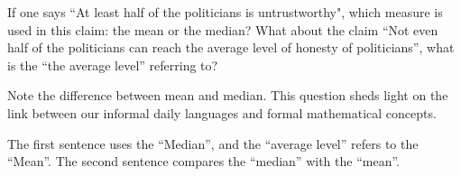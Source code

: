 	\begin{exercise}
		If one says ``At least half of the politicians is untrustworthy", which measure is used in this claim: the mean or the median? What about the claim ``Not even half of the politicians can reach the average level of honesty of politicians'', what is the ``the average level'' referring to? 
		\begin{hint}
			Note the difference between mean and median. This question sheds light on the link between our informal daily languages and formal mathematical concepts. 
		\end{hint}
		\begin{solution}
			The first sentence uses the ``Median'', and the ``average level'' refers to the ``Mean''.  The second sentence compares the ``median'' with the ``mean''.
		\end{solution}
	\end{exercise}
	
